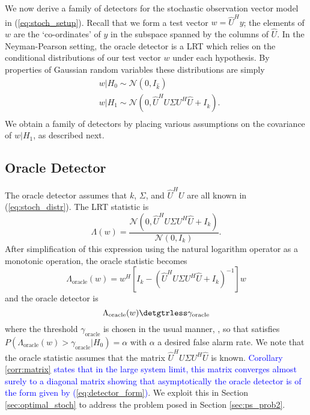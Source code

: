 We now derive a family of detectors for the stochastic observation vector model in (\ref{eq:stoch_setup}). Recall that we form a test vector $w=\widehat{U}^Hy$; the elements of $w$ are the `co-ordinates' of $y$ in the subspace spanned by the columns of $\widehat{U}$. In the Neyman-Pearson setting, the oracle detector is a LRT which relies on the conditional distributions of our test vector $w$ under each hypothesis. By properties of Gaussian random variables these distributions are simply
\begin{equation}\label{eq:stoch_distr}
\begin{aligned}
&w|H_0\sim\mathcal{N}\left(0,I_{\widehat{k}}\right)\\
&w|H_1\sim\mathcal{N}\left(0, \widehat{U}^HU\Sigma U^H\widehat{U} +I_{\widehat{k}}\right).\\
\end{aligned}
\end{equation}
We obtain a family of detectors by placing various assumptions on the covariance of $w|H_1$, as described next.

\subsection{Oracle Detector}\label{sec:oracle_stoch}
The oracle detector assumes that $k$, $\Sigma$, and $\widehat{U}^{H}U$ are all known in (\ref{eq:stoch_distr}). The LRT statistic is
\begin{equation*}
\Lambda(w)=\frac{\mathcal{N}(0,\widehat{U}^HU\Sigma U^H\widehat{U} + I_k)}{\mathcal{N}(0,I_{k})}.
\end{equation*}
After simplification of this expression using the natural logarithm operator as a monotonic operation, the oracle statistic becomes
\begin{equation}\label{eq:oracle_stat_stoch}
\boxed{\Lambda_{\text{oracle}}(w) = w^H\left[I_k-\left(\widehat{U}^HU\Sigma U^H\widehat{U}+I_k\right)^{-1}\right]w}
\end{equation}
and the oracle detector is
\begin{equation}\label{eq:oracle_class_stoch}
\Lambda_{\text{oracle}}(w) \detgtrless \gamma_{\text{oracle}}
\end{equation}
where the threshold $\gamma_{\text{oracle}}$ is chosen in the usual manner, \ie, so that satisfies $P(\Lambda_{\text{oracle}}(w)>\gamma_{\text{oracle}}|H_0)=\alpha$ with $\alpha$ a desired false alarm rate. We note that the oracle statistic assumes that the matrix $\widehat{U}^HU\Sigma U^H\widehat{U}$ is known. \textcolor{blue}{Corollary \ref{corr:matrix} states that in the large system limit, this matrix converges almost surely to a diagonal matrix showing that asymptotically the oracle detector is of the form given by (\ref{eq:detector_form})}.  We exploit this in Section \ref{sec:optimal_stoch} to address the problem posed in Section \ref{sec:ps_prob2}.

